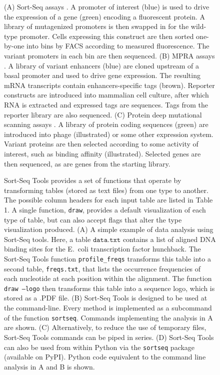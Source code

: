 \documentclass{bmcart}
\begin{document}
%
%
\begin{figure}[h!]
\caption{
(A) Sort-Seq assays \cite{Kinney:2010tn,Sharon:2012io}. A promoter of interest (blue) is used to drive the expression of a gene (green) encoding a fluorescent protein. A library of mutagenized promoters is then swapped in for the wild-type promoter. Cells expressing this construct are then sorted one-by-one into bins by FACS according to measured fluorescence. The variant promoters in each bin are then sequenced. (B) MPRA assays \cite{Melnikov:2012dw,Patwardhan:2012hy,Kwasnieski:2012hu}. A library of variant enhancers (blue) are cloned upstream of a basal promoter and used to drive gene expression. The resulting mRNA transcripts contain enhancers-specific tags (brown). Reporter constructs are introduced into mammalian cell culture, after which RNA is extracted and expressed tags are sequences. Tags from the reporter library are also sequenced. (C) Protein deep mutational scanning assays \cite{Fowler:2010gt,Fowler:2014gq}. A library of protein coding sequences (green) are introduced into phage (illustrated) or some other expression system. Variant proteins are then selected according to some activity of interest, such as binding affinity (illustrated). Selected genes are then sequenced, as are genes from the starting library.
}
\end{figure}


%
%
\begin{figure}[h!]
\caption{
Sort-Seq Tools provides a set of functions that operate by transforming tables (stored as text files) from one type to another. The possible column headers for each input table are listed in Table 1. A single function, \texttt{draw}, provides a default visualization of each type of table, but can also accept flags that alter the type visualization produced. (A) A simple example of data analysis using Sort-Seq tools. Here, a table $\texttt{data.txt}$ contains a list of aligned DNA binding sites for the E.\ coli transcription factor hunchback. The Sort-Seq Tools function \texttt{profile\_freqs} transforms this table into a second table, \texttt{freqs.txt}, that lists the occurrence frequencies of each nucleotide at each position within the alignment. The function \texttt{draw --logo} then transforms this table into a sequence logo, which is stored as a .PDF file. (B) Sort-Seq Tools is designed to be used at the command-line. Every method is implemented as a subcommand of the function \texttt{sortseq}. Commands implementing the analysis in A are shown. (C) Alternatively, to reduce the use of temporary files, Sort-Seq Tools commands can be piped in series. (D) Sort-Seq Tools can also be used from within Python via the \texttt{sortseq} package (available on PyPI). Python code equivalent to the command line analysis in A and B is shown.
}
\end{figure}
\end{document}
